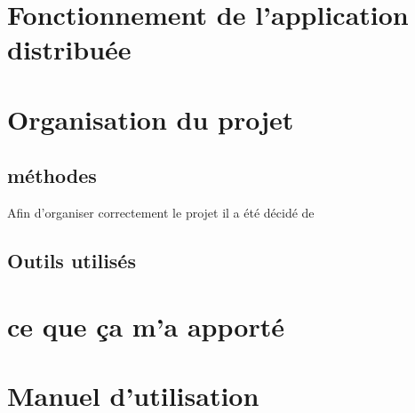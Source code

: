 \documentclass[12pt,a4paper]{report}
\begin{document}
\newpage




\chapter{Fonctionnement de l'application distribuée}

\chapter{Organisation du projet}

\section{méthodes}
Afin d'organiser correctement le projet il a été décidé de 

\section{Outils utilisés}

\chapter{ce que ça m'a apporté}

\chapter{Manuel d'utilisation}
\end{document}
